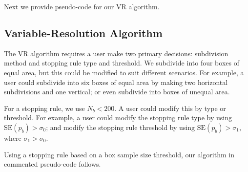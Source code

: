 Next we provide pseudo-code for our VR algorithm.
      	
\subsection{Variable-Resolution Algorithm}

The VR algorithm requires a user make two primary decisions: subdivision method and stopping rule type and threshold. We subdivide into four boxes of equal area, but this could be modified to suit different scenarios. For example, a user could subdivide into six boxes of equal area by making two horizontal subdivisions and one vertical; or even subdivide into boxes of unequal area.

For a stopping rule, we use $N_{b} < 200$. A user could modify this by type or threshold. For example, a user could modify the stopping rule type by using $\text{SE}(p_{b}) > \sigma_{0}$; and modify the stopping rule threshold by using $\text{SE}(p_{b}) > \sigma_{1}$, where $\sigma_{1} > \sigma_{0}$.

Using a stopping rule based on a box sample size threshold, our algorithm in commented pseudo-code follows.

